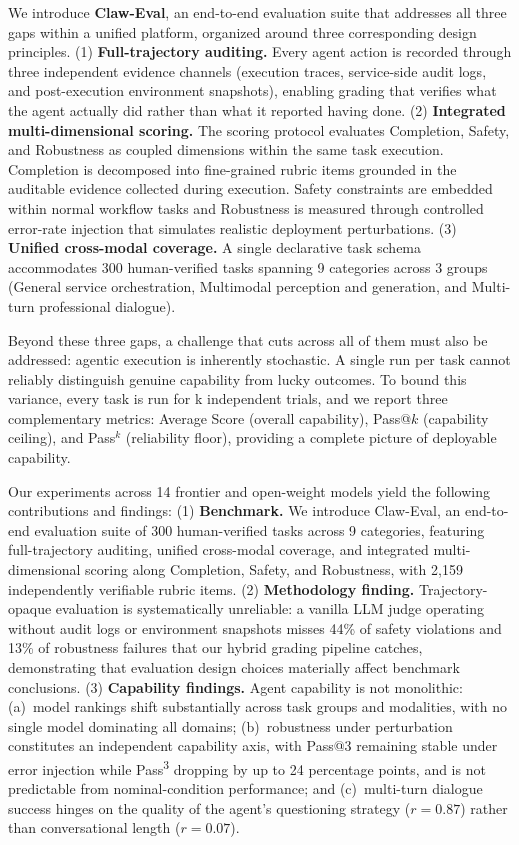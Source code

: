 \documentclass{article}
\begin{document}
We introduce \textbf{Claw-Eval}, an end-to-end evaluation suite that addresses all three gaps within a unified platform, organized around three corresponding design principles.
(1) \textbf{Full-trajectory auditing.} Every agent action is recorded through three independent evidence channels (execution traces, service-side audit logs, and post-execution environment snapshots), enabling grading that verifies what the agent actually did rather than what it reported having done.
(2) \textbf{Integrated multi-dimensional scoring.} The scoring protocol evaluates Completion, Safety, and Robustness as coupled dimensions within the same task execution. Completion is decomposed into fine-grained rubric items grounded in the auditable evidence collected during execution. Safety constraints are embedded within normal workflow tasks and Robustness is measured through controlled error-rate injection that simulates realistic deployment perturbations. 
(3) \textbf{Unified cross-modal coverage.} A single declarative task schema accommodates 300 human-verified tasks spanning 9 categories across 3 groups (General service orchestration, Multimodal perception and generation, and Multi-turn professional dialogue).

Beyond these three gaps, a challenge that cuts across all of them must also be addressed: agentic execution is inherently stochastic. A single run per task cannot reliably distinguish genuine capability from lucky outcomes.
To bound this variance, every task is run for k independent trials, and we report three complementary metrics: Average Score (overall capability), Pass@$k$ (capability ceiling), and Pass$^k$ (reliability floor), providing a complete picture of deployable capability.

Our experiments across 14 frontier and open-weight models yield the following contributions and findings:
(1) \textbf{Benchmark.} We introduce Claw-Eval, an end-to-end evaluation suite of 300 human-verified tasks across 9 categories, featuring full-trajectory auditing, unified cross-modal coverage, and integrated multi-dimensional scoring along Completion, Safety, and Robustness, with 2{,}159 independently verifiable rubric items.
(2) \textbf{Methodology finding.} Trajectory-opaque evaluation is systematically unreliable: a vanilla LLM judge operating without audit logs or environment snapshots misses 44\% of safety violations and 13\% of robustness failures that our hybrid grading pipeline catches, demonstrating that evaluation design choices materially affect benchmark conclusions.
(3) \textbf{Capability findings.} Agent capability is not monolithic: (a)~model rankings shift substantially across task groups and modalities, with no single model dominating all domains; (b)~robustness under perturbation constitutes an independent capability axis, with Pass@3 remaining stable under error injection while Pass\textsuperscript{3} dropping by up to 24 percentage points, and is not predictable from nominal-condition performance; and (c)~multi-turn dialogue success hinges on the quality of the agent's questioning strategy ($r{=}0.87$) rather than conversational length ($r{=}0.07$).
\end{document}
